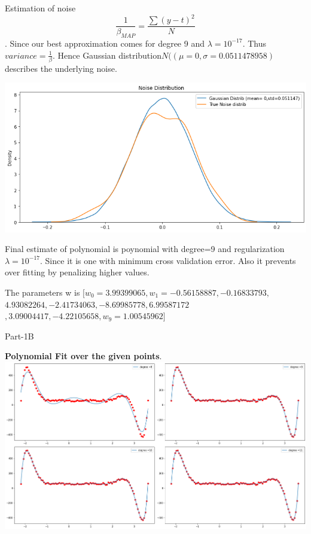 \documentclass[11pt]{beamer}
\begin{document}
\begin{frame}

Estimation of noise 
$$\frac{1}{\beta_{MAP}}= \frac{\sum{(y-t)^2}}{N}$$.
Since our best approximation comes for degree 9 and $\lambda=10^{-17}$. Thus $variance =\frac{1}{\beta}$. Hence Gaussian distribution$N((\mu= 0,\sigma=0.0511478958) $describes the underlying noise.

\includegraphics[scale=0.35]{images/28.png}
\end{frame}


\begin{frame}
Final estimate of polynomial is poynomial with degree=9 and regularization $\lambda=10^{-17}$. Since it is one with minimum cross validation error. Also it prevents over fitting by penalizing higher values.

The parameters w is $[w_0=3.99399065,w_1= -0.56158887, -0.16833793, $ $4.93082264, -2.41734063 ,-8.69985778,6.99587172$  $,3.09004417 ,-4.22105658 , w_9=1.00545962]$
\end{frame}






\begin{frame}

\begin{Huge}
Part-1B
\end{Huge}
\end{frame}



\begin{frame}
\textbf{Polynomial Fit over the given points}.
\includegraphics[scale=0.25]{images/19.png}
\end{frame}
\end{document}
